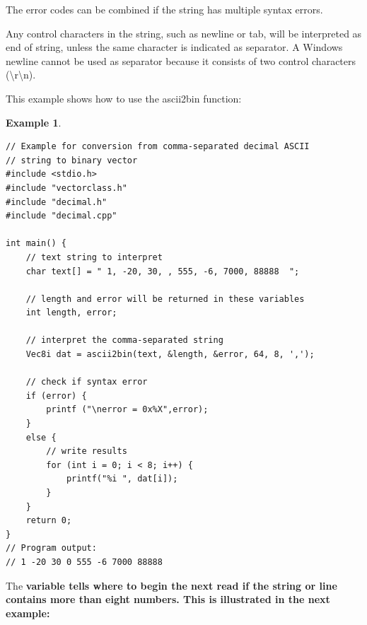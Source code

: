 \documentclass[11pt,a4paper,oneside,openright]{report}
\newtheorem{example}{Example}[chapter]  %
\newcommand{\vspacesmall}{\vspace{3mm}}
\newcommand{\vspacebig}{\vspace{6mm}}
\newcommand{\codei}[1]{\bfseries \ttfamily{#1}\normalfont}
\begin{document}
The error codes can be combined if the string has multiple syntax errors.

\vspacesmall
Any control characters in the string, such as newline or tab, will be interpreted as end of string, unless the same character is indicated as separator. A Windows newline cannot be used as separator because it consists of two control characters (\textbackslash r\textbackslash n).
\vspacebig

This example shows how to use the ascii2bin function:

\begin{example}
\label{example2}
\end{example} %
\begin{lstlisting}[frame=single]
// Example for conversion from comma-separated decimal ASCII 
// string to binary vector
#include <stdio.h>
#include "vectorclass.h"        
#include "decimal.h" 
#include "decimal.cpp"

int main() {
    // text string to interpret
    char text[] = " 1, -20, 30, , 555, -6, 7000, 88888  ";

    // length and error will be returned in these variables
    int length, error;

    // interpret the comma-separated string
    Vec8i dat = ascii2bin(text, &length, &error, 64, 8, ',');

    // check if syntax error
    if (error) {    
        printf ("\nerror = 0x%X",error);
    }
    else {
        // write results
        for (int i = 0; i < 8; i++) {
            printf("%i ", dat[i]);
        }
    }
    return 0;
}
// Program output:
// 1 -20 30 0 555 -6 7000 88888
\end{lstlisting}
\vspacesmall


The \codei{chars\_read} variable tells where to begin the next read if the string or line contains more than eight numbers. This is illustrated in the next example:
\end{document}
